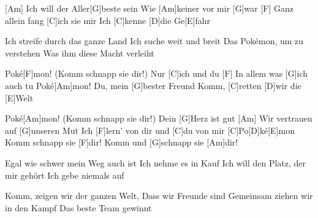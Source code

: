

\begin{guitar}
	[Am] Ich will der Aller[G]beste sein
	Wie [Am]keiner vor mir [G]war
	[F] Ganz allein fang [C]ich sie mir
	Ich [C]kenne [D]die Ge[E]fahr
	
	Ich streife durch das ganze Land
	Ich suche weit und breit
	Das Pokémon, um zu verstehen
	Was ihm diese Macht verleiht
	
	\begin{highlightbar}
		Poké[F]mon! (Komm schnapp sie dir!) Nur [C]ich und du
		[F] In allem was [G]ich auch tu
		Poké[Am]mon! Du, mein [G]bester Freund
		Komm, [C]retten [D]wir die [E]Welt
		
		Poké[Am]mon! (Komm schnapp sie dir!) Dein [G]Herz ist gut
		[Am] Wir vertrauen auf [G]unseren Mut
		Ich [F]lern' von dir und [C]du von mir
		[C]Po[D]ké[E]mon
		Komm schnapp sie [F]dir! Komm und [G]schnapp sie [Am]dir!
	\end{highlightbar}
	
	\songsection{Strophe 2}
	Egal wie schwer mein Weg auch ist
	Ich nehme es in Kauf
	Ich will den Platz, der mir gehört
	Ich gebe niemals auf
	
	Komm, zeigen wir der ganzen Welt,
	Dass wir Freunde sind
	Gemeinsam ziehen wir in den Kampf
	Das beste Team gewinnt
	
	\begin{highlightbar}
		  \optionalChord{(x2)}
	\end{highlightbar}
\end{guitar}